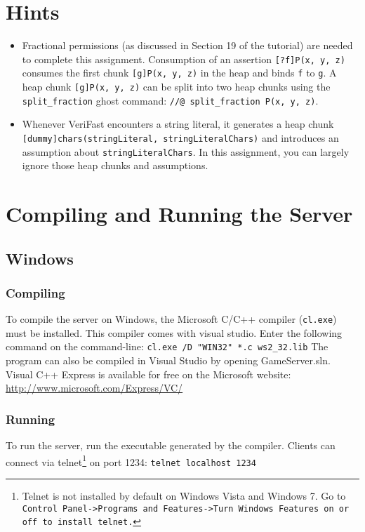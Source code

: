 \documentclass{article}
\begin{document}
\section{Hints}

\begin{itemize}
  \item Fractional permissions (as discussed in Section 19 of the tutorial) are needed to complete this assignment. Consumption of an assertion \texttt{[?f]P(x, y, z)} consumes the first chunk \texttt{[g]P(x, y, z)} in the heap and binds \texttt{f} to \texttt{g}. A heap chunk \texttt{[g]P(x, y, z)} can be split into two heap chunks using the \texttt{split\_fraction} ghost command: \texttt{//@ split\_fraction P(x, y, z)}.
  \item Whenever VeriFast encounters a string literal, it generates a heap chunk \texttt{[dummy]chars(stringLiteral, stringLiteralChars)} and introduces an assumption about \texttt{stringLiteralChars}. In this assignment, you can largely ignore those heap chunks and assumptions.
\end{itemize}

\section{Compiling and Running the Server}

\subsection{Windows}

\subsubsection*{Compiling}
To compile the server on Windows, the Microsoft C/C++ compiler (\texttt{cl.exe}) must be installed. This compiler comes with visual studio. Enter the following command on the command-line:\newline\newline
\texttt{cl.exe /D "WIN32" *.c ws2\_32.lib}\newline\newline
The program can also be compiled in Visual Studio by opening GameServer.sln. Visual C++ Express is available for free on the Microsoft website:\newline\newline
\url{http://www.microsoft.com/Express/VC/}
\subsubsection*{Running}
To run the server, run the executable generated by the compiler. Clients can connect via telnet\footnote{Telnet is not installed by default on Windows Vista and Windows 7. Go to \texttt{Control Panel->Programs and Features->Turn Windows Features on or off to install telnet.}} on port 1234:
\newline\newline
\texttt{telnet localhost 1234}
\end{document}
